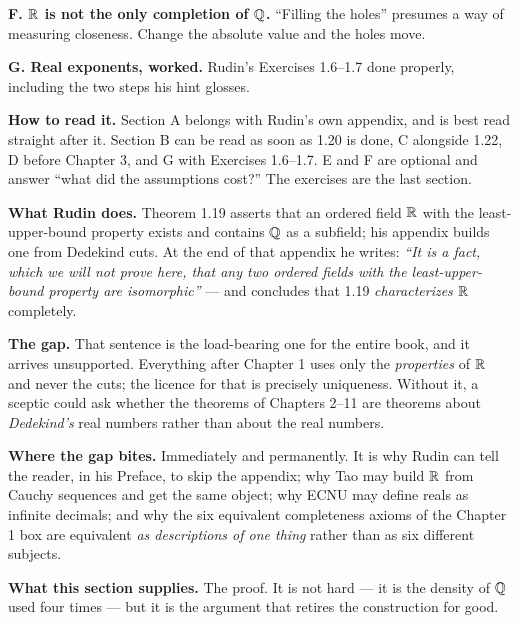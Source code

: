 \begin{roadmap}
\medskip
\textbf{F. $\mathbb{R}$ is not the only completion of $\mathbb{Q}$.} ``Filling the holes''
presumes a way of measuring closeness. Change the absolute value and the
holes move.

\medskip
\textbf{G. Real exponents, worked.} Rudin's Exercises 1.6--1.7 done
properly, including the two steps his hint glosses.

\medskip
\textbf{How to read it.} Section A belongs with Rudin's own appendix, and is
best read straight after it. Section B can be read as soon as 1.20 is done,
C alongside 1.22, D before Chapter 3, and G with Exercises 1.6--1.7. E and F
are optional and answer ``what did the assumptions cost?'' The exercises are
the last section.
\end{roadmap}


\begin{roadmap}
\raggedright
\textbf{What Rudin does.} Theorem 1.19 asserts that an ordered field $\mathbb{R}$
with the least-upper-bound property exists and contains $\mathbb{Q}$ as a subfield;
his appendix builds one from Dedekind cuts. At the end of that appendix he
writes: \emph{``It is a fact, which we will not prove here, that any two
ordered fields with the least-upper-bound property are isomorphic''} --- and
concludes that 1.19 \emph{characterizes} $\mathbb{R}$ completely.

\smallskip
\textbf{The gap.} That sentence is the load-bearing one for the entire book,
and it arrives unsupported. Everything after Chapter 1 uses only the
\emph{properties} of $\mathbb{R}$ and never the cuts; the licence for that is
precisely uniqueness. Without it, a sceptic could ask whether the theorems of
Chapters 2--11 are theorems about \emph{Dedekind's} real numbers rather than
about the real numbers.

\smallskip
\textbf{Where the gap bites.} Immediately and permanently. It is why Rudin
can tell the reader, in his Preface, to skip the appendix; why Tao may build
$\mathbb{R}$ from Cauchy sequences and get the same object; why ECNU may define reals
as infinite decimals; and why the six equivalent completeness axioms of the
Chapter 1 box are equivalent \emph{as descriptions of one thing} rather than
as six different subjects.

\smallskip
\textbf{What this section supplies.} The proof. It is not hard --- it is the
density of $\mathbb{Q}$ used four times --- but it is the argument that retires the
construction for good.
\end{roadmap}


